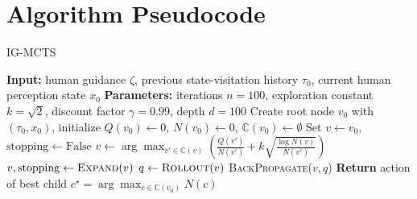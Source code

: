 \newpage
\section{Algorithm Pseudocode}\label{appendix:pseudocode}
\begin{algorithm}[htbp]
\caption{IG-MCTS}
\label{algo:IG_MCTS}
\begin{algorithmic}[1]
    \STATE \textbf{Input:} human guidance $\zeta$, previous state-visitation history $\tau_0$, current human perception state $x_0$
    \STATE \textbf{Parameters:} iterations $n=100$, exploration constant $k=\sqrt{2}$, discount factor $\gamma=0.99$, depth $d=100$
    \STATE Create root node $v_0$ with $(\tau_0, x_0)$, initialize $Q(v_0) \gets 0$, $N(v_0) \gets 0$, $\mathbb{C}(v_0) \gets \emptyset$
        \STATE Set $v \gets v_0$, $\mathrm{stopping} \gets \text{False}$
                \STATE $v \gets \arg\max_{v' \in \mathbb{C}(v)} \left( \frac{Q(v')}{N(v')} + k \sqrt{\frac{\log N(v)}{N(v')}} \right)$
            \ELSE
                \STATE $v, \mathrm{stopping} \gets \textsc{Expand}(v)$
            \ENDIF
        \ENDWHILE
        \STATE $q \gets \textsc{Rollout}(v)$
        \STATE \textsc{BackPropagate}($v, q$)
    \ENDFOR
    \STATE \textbf{Return} action of best child $c^\star = \arg\max_{c \in \mathbb{C}(v_0)} N(c)$
\end{algorithmic}
\end{algorithm}

